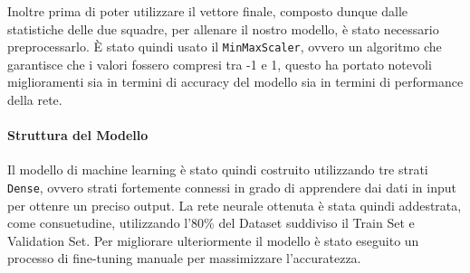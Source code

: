 Inoltre prima di poter utilizzare il vettore finale, composto dunque dalle statistiche delle due squadre, per allenare il nostro modello, è stato necessario preprocessarlo. È stato quindi usato il \texttt{MinMaxScaler}, ovvero un algoritmo che garantisce che i valori fossero compresi tra -1 e 1, questo ha portato notevoli miglioramenti sia in termini di accuracy del modello sia in termini di performance della rete.

\paragraph{Struttura del Modello}
Il modello di machine learning è stato quindi costruito utilizzando tre strati \texttt{Dense}, ovvero strati fortemente connessi in grado di apprendere dai dati in input per ottenre un preciso output. La rete neurale ottenuta è stata quindi addestrata, come consuetudine, utilizzando l'80\% del Dataset suddiviso il Train Set e Validation Set.
Per migliorare ulteriormente il modello è stato eseguito un processo di fine-tuning manuale per massimizzare l'accuratezza.

